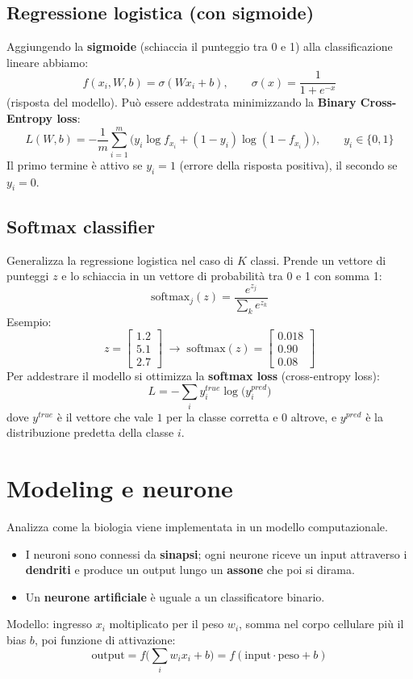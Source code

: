 \documentclass[11pt,a4paper]{article}
\begin{document}
\subsection{Regressione logistica (con sigmoide)}
Aggiungendo la \textbf{sigmoide} (schiaccia il punteggio tra 0 e 1) alla classificazione lineare abbiamo:
\[
f(x_i,W,b) = \sigma(Wx_i+b), \qquad \sigma(x)=\frac{1}{1+e^{-x}}
\]
(risposta del modello). Può essere addestrata minimizzando la \textbf{Binary Cross-Entropy loss}:
\[
L(W,b) = -\frac{1}{m}\sum_{i=1}^{m}\Big(y_i\log f_{x_i} + (1-y_i)\log(1-f_{x_i})\Big), \qquad y_i\in\{0,1\}
\]
Il primo termine è attivo se $y_i=1$ (errore della risposta positiva), il secondo se $y_i=0$.

\subsection{Softmax classifier}
Generalizza la regressione logistica nel caso di $K$ classi. Prende un vettore di punteggi $z$ e lo schiaccia in un vettore di probabilità tra 0 e 1 con somma 1:
\[
\text{softmax}_j(z) = \frac{e^{z_j}}{\sum_k e^{z_k}}
\]
Esempio:
\[
z = \begin{bmatrix}1.2\\5.1\\2.7\end{bmatrix}
\;\longrightarrow\;
\text{softmax}(z) = \begin{bmatrix}0.018\\0.90\\0.08\end{bmatrix}
\]
Per addestrare il modello si ottimizza la \textbf{softmax loss} (cross-entropy loss):
\[
L = -\sum_i y_i^{true}\log\big(y_i^{pred}\big)
\]
dove $y^{true}$ è il vettore che vale $1$ per la classe corretta e $0$ altrove, e $y^{pred}$ è la distribuzione predetta della classe $i$.

\section{Modeling e neurone}

Analizza come la biologia viene implementata in un modello computazionale.

\begin{itemize}
  \item I neuroni sono connessi da \textbf{sinapsi}; ogni neurone riceve un input attraverso i \textbf{dendriti} e produce un output lungo un \textbf{assone} che poi si dirama.
  \item Un \textbf{neurone artificiale} è uguale a un classificatore binario.
\end{itemize}
Modello: ingresso $x_i$ moltiplicato per il peso $w_i$, somma nel corpo cellulare più il bias $b$, poi funzione di attivazione:
\[
\text{output} = f\Big(\sum_i w_i x_i + b\Big) = f(\text{input}\cdot\text{peso} + b)
\]
\end{document}
